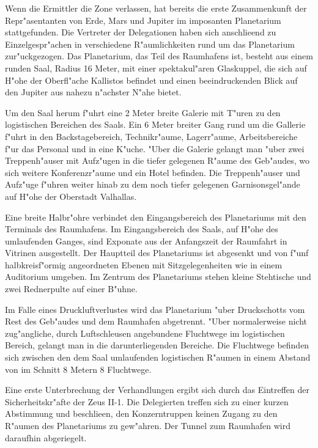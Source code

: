 
Wenn die Ermittler die Zone verlassen, hat bereits die erste Zusammenkunft der Repr"asentanten von Erde, Mars und Jupiter im imposanten Planetarium stattgefunden. Die Vertreter der Delegationen haben sich anschlie\3end zu Einzelgespr"achen in verschiedene R"aumlichkeiten rund um das Planetarium zur"uckgezogen. Das Planetarium, das Teil des Raumhafens ist, besteht aus einem runden Saal, Radius 16 Meter, mit einer spektakul"aren Glaskuppel, die sich auf H"ohe der Oberfl"ache Kallistos befindet und einen beeindruckenden Blick auf den Jupiter aus nahezu n"achster N"ahe bietet.

Um den Saal herum f"uhrt eine 2 Meter breite Galerie mit T"uren zu den logistischen Bereichen des Saals. Ein 6 Meter breiter Gang rund um die Gallerie f"uhrt in den Backstagebereich, Technikr"aume, Lagerr"aume, Arbeitsbereiche f"ur das Personal und in eine K"uche. "Uber die Galerie gelangt man "uber zwei Treppenh"auser mit Aufz"ugen in die tiefer gelegenen R"aume des Geb"audes, wo sich weitere Konferenzr"aume und ein Hotel befinden. Die Treppenh"auser und Aufz"uge f"uhren weiter hinab zu dem noch tiefer gelegenen Garnisonsgel"ande auf H"ohe der Oberstadt Valhallas.

Eine breite Halbr"ohre verbindet den Eingangsbereich des Planetariums mit den Terminals des Raumhafens. Im Eingangsbereich des Saals, auf H"ohe des umlaufenden Ganges, sind Exponate aus der Anfangszeit der Raumfahrt in Vitrinen ausgestellt. Der Hauptteil des Planetariums ist abgesenkt und von f"unf halbkreisf"ormig angeordneten Ebenen mit Sitzgelegenheiten wie in einem Auditorium umgeben. Im Zentrum des Planetariums stehen kleine Stehtische und zwei Rednerpulte auf einer B"uhne.

Im Falle eines Druckluftverlustes wird das Planetarium "uber Druckschotts vom Rest des Geb"audes und dem Raumhafen abgetrennt. "Uber normalerweise nicht zug"angliche, durch Luftschleusen angebundene Fluchtwege im logistischen Bereich, gelangt man in die darunterliegenden Bereiche. Die Fluchtwege befinden sich zwischen den dem Saal umlaufenden logistischen R"aumen in einem Abstand von im Schnitt 8 Metern 8 Fluchtwege.

Eine erste Unterbrechung der Verhandlungen ergibt sich durch das Eintreffen der Sicherheitskr"afte der Zeus II-1. Die Delegierten treffen sich zu einer kurzen Abstimmung und beschlie\3en, den Konzerntruppen keinen Zugang zu den R"aumen des Planetariums zu gew"ahren. Der Tunnel zum Raumhafen wird daraufhin abgeriegelt.

